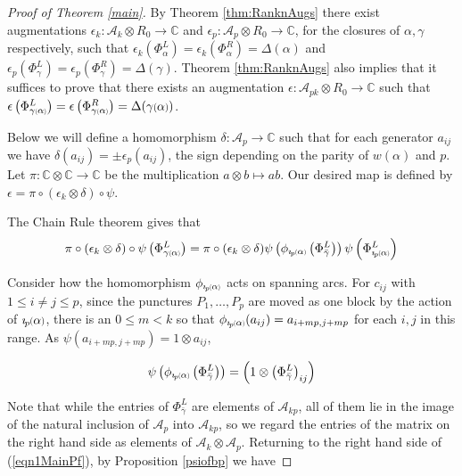\documentclass[11pt]{amsart}
\def\C{{\mathbb C}}
\def\A{{\mathcal A}}
\newcommand*{\smallp}[1]{\scalebox{.75}{\ensuremath#1}}
\newcommand*{\subsmallp}[1]{\scalebox{.5}{\ensuremath#1}}
\newcommand{\pp}[2][p]{\imath_{\hspace*{-1pt}#1}\hspace*{-.5pt}\smallp(#2\smallp)}
\newcommand{\subpp}[2][p]{\imath_{\hspace*{-1pt}#1}\hspace*{-.5pt}\subsmallp(#2\subsmallp)}
\theoremstyle{definition}
\begin{document}
\begin{proof}[Proof of Theorem \ref{main}]
By Theorem \ref{thm:RanknAugs} there exist augmentations $\epsilon_k\colon \A_k\otimes R_0 \rightarrow \C$ and $\epsilon_p\colon \A_p\otimes R_0 \rightarrow \C$, for the closures of $\alpha,\gamma$ respectively, such that $\epsilon_k\left(\Phi_\alpha^L\right) = \epsilon_k\left(\Phi_\alpha^R\right) = \Delta(\alpha)$ and $\epsilon_p\left(\Phi_{\gamma}^L\right) = \epsilon_p\left(\Phi_{\gamma}^R\right) = \Delta(\gamma)$. Theorem \ref{thm:RanknAugs} also implies that it suffices to prove that there exists an augmentation $\epsilon\colon \A_{pk}\otimes R_0\rightarrow \C$ such that $\epsilon\left(\Phi_{\gamma\subsmallp(\alpha\subsmallp)}^L\right) = \epsilon\left(\Phi_{\gamma\subsmallp(\alpha\subsmallp)}^R\right) = \Delta(\gamma\smallp(\alpha\smallp))$.


Below we will define a homomorphism $\delta\colon\A_p\rightarrow \C$ such that for each generator $a_{ij}$ we have $\delta(a_{ij}) = \pm \epsilon_p(a_{ij})$, the sign depending on the parity of $w(\alpha)$ and $p$. Let $\pi\colon \C\otimes \C \rightarrow \C$ be the multiplication $a\otimes b\mapsto ab$. Our desired map is defined by $\epsilon = \pi\circ(\epsilon_k\otimes\delta)\circ\psi$.


The Chain Rule theorem gives that
\begin{equation}
\pi\circ(\epsilon_k\otimes\delta)\circ\psi\left(\Phi_{\gamma\subsmallp(\alpha\subsmallp)}^L\right) = \pi\circ(\epsilon_k\otimes\delta)\psi\left(\phi_{\subpp\alpha}\left(\Phi_{\bar\gamma}^L\right)\right)\psi\left(\Phi_{\subpp\alpha}^L\right)
\label{eqn1MainPf}
\end{equation}

Consider how the homomorphism $\phi_{\subpp\alpha}$ acts on spanning arcs. For $c_{ij}$ with $1\le i\ne j\le p$, since the punctures $P_1,\ldots,P_p$ are moved as one block by the action of $\pp\alpha$, there is an $0\le m<k$ so that $\phi_{\subpp\alpha}(a_{ij})=a_{i+mp,j+mp}$ for each $i,j$ in this range. As $\psi(a_{i + mp, j+mp})=1\otimes a_{ij}$,

$$\psi\left(\phi_{\subpp\alpha}\left(\Phi_{\bar\gamma}^L\right)\right) = \left(1\otimes \left(\Phi_{\bar\gamma}^L\right)_{ij}\right)$$

Note that while the entries of $\Phi_{\bar\gamma}^L$ are elements of $\A_{kp}$, all of them lie in the image of the natural inclusion of $\A_p$ into $\A_{kp}$, so we regard the entries of the matrix on the right hand side as elements of $\A_k\otimes \A_p$. Returning to the right hand side of (\ref{eqn1MainPf}), by Proposition \ref{psiofbp} we have


\end{proof}
\end{document}
